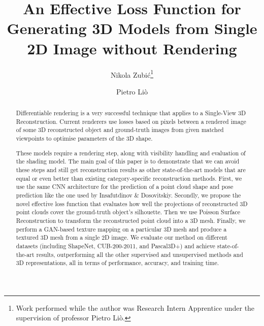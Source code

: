 \documentclass[runningheads]{llncs}
\begin{document}
\title{An Effective Loss Function for Generating 3D Models from Single 2D Image without Rendering}
\author{Nikola Zubi\'{c}\thanks{Work performed while the author was Research Intern Apprentice under the supervision of professor Pietro Li\`{o}.} \and
Pietro Li\`{o}}
\maketitle              \begin{abstract}
Differentiable rendering is a very successful technique that applies to a Single-View 3D Reconstruction. Current renderers use losses based on pixels between a rendered image of some 3D reconstructed object and ground-truth images from given matched viewpoints to optimise parameters of the 3D shape.

These models require a rendering step, along with visibility handling and evaluation of the shading model. The main goal of this paper is to demonstrate that we can avoid these steps and still get reconstruction results as other state-of-the-art models that are equal or even better than existing category-specific reconstruction methods.
First, we use the same CNN architecture for the prediction of a point cloud shape and pose prediction like the one used by Insafutdinov \& Dosovitskiy.
Secondly, we propose the novel effective loss function that evaluates how well the projections of reconstructed 3D point clouds cover the ground-truth object's silhouette.
Then we use Poisson Surface Reconstruction to transform the reconstructed point cloud into a 3D mesh. 
Finally, we perform a GAN-based texture mapping on a particular 3D mesh and produce a textured 3D mesh from a single 2D image. We evaluate our method on different datasets (including ShapeNet, CUB-200-2011, and Pascal3D+) and achieve state-of-the-art results, outperforming all the other supervised and unsupervised methods and 3D representations, all in terms of performance, accuracy, and training time.

\end{abstract}
\end{document}
